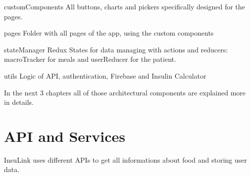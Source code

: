 \documentclass[12pt,hidelinks]{article}
\begin{document}
	\begin{docCommand}{customComponents}{}
		All buttons, charts and pickers specifically designed for the pages.
	\end{docCommand}

	\begin{docCommand}{pages}{}
		Folder with all pages of the app, using the custom components
	\end{docCommand}

	\begin{docCommand}{stateManager}{}
		Redux States for data managing with actions and reducers: macroTracker for meals and userReducer for the patient.
	\end{docCommand}

	\begin{docCommand}{utils}{}
		Logic of API, authentication, Firebase and Insulin Calculator
	\end{docCommand}


In the next 3 chapters all of those architectural components are explained more in details.

\newpage
\section{API and Services}	
\vspace{10.5cm}	
InsuLink uses different APIs to get all informations about food and storing user data.
\end{document}
